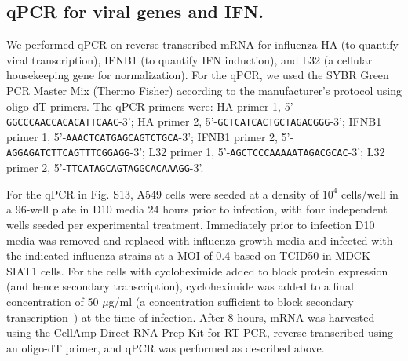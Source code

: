 \documentclass[]{article}
\begin{document}
\subsection*{qPCR for viral genes and IFN.}
We performed qPCR on reverse-transcribed mRNA for influenza HA (to quantify viral transcription), IFNB1 (to quantify IFN induction), and L32 (a cellular housekeeping gene for normalization).
For the qPCR, we used the SYBR Green PCR Master Mix (Thermo Fisher) according to the manufacturer's protocol using oligo-dT primers.
The qPCR primers were: HA primer 1, 5'-\texttt{GGCCCAACCACACATTCAAC}-3'; HA primer 2, 5'-\texttt{GCTCATCACTGCTAGACGGG}-3'; IFNB1 primer 1, 5'-\texttt{AAACTCATGAGCAGTCTGCA}-3'; IFNB1 primer 2, 5'-\texttt{AGGAGATCTTCAGTTTCGGAGG}-3'; L32 primer 1, 5'-\texttt{AGCTCCCAAAAATAGACGCAC}-3'; L32 primer 2, 5'-\texttt{TTCATAGCAGTAGGCACAAAGG}-3'. 

For the qPCR in Fig. S13, A549 cells were seeded at a density of $10^4$ cells/well in a 96-well plate in D10 media 24 hours prior to infection, with four independent wells seeded per experimental treatment. 
Immediately prior to infection D10 media was removed and replaced with influenza growth media and infected with the indicated influenza strains at a MOI of 0.4 based on TCID50 in MDCK-SIAT1 cells.
For the cells with cycloheximide added to block protein expression (and hence secondary transcription), cycloheximide was added to a final concentration of 50 $\mu$g/ml (a concentration sufficient to block secondary transcription~\cite{killip2014activation}) at the time of infection.
After 8 hours, mRNA was harvested using the CellAmp Direct RNA Prep Kit for RT-PCR, reverse-transcribed using an oligo-dT primer, and qPCR was performed as described above.
\end{document}
